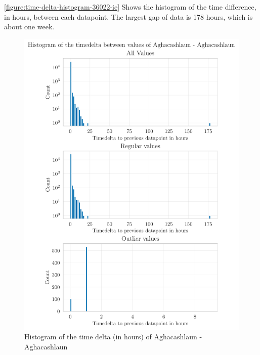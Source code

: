 \autoref{figure:time-delta-histogram-36022-ie} Shows the histogram of the time difference, in hours, between each datapoint. The largest gap of data is 178 hours, which is about one week.
\begin{figure}[htp]
    \centering
    \includegraphics{./plots/pdfs/36022-ie/time_delta_histogram_36022-ie.pdf}
    \caption{Histogram of the time delta (in hours) of Aghacashlaun - Aghacashlaun}
    \label{figure:time-delta-histogram-36022-ie}
\end{figure}

